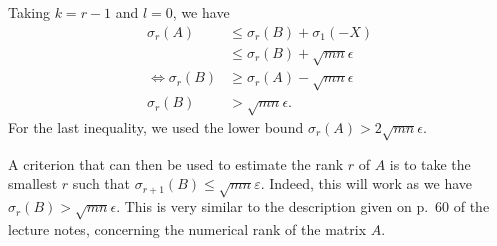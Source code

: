 \documentclass[11pt]{article}
\newcommand{\snorm}[1]{\norm{#1}_2} %
\begin{document}
Taking $k = r-1$ and $l = 0$, we have
\begin{align*}
\sigma_r(A) &\leqslant \sigma_{r}(B) + \sigma_{1}(-X)\\
&\leqslant \sigma_{r}(B) + \sqrt{mn}\epsilon\\
\iff \sigma_r(B) &\geqslant \sigma_r(A) - \sqrt{mn}\epsilon\\
 \sigma_r(B)&> \sqrt{mn}\epsilon.
\end{align*}
For the last inequality, we used the lower bound $\sigma_r(A) > 2\sqrt{mn}\epsilon$.

A criterion that can then be used to estimate the rank \(r\) of \(A\) is to take the smallest \(r\) such that \(\sigma_{r + 1}(B) \leqslant \sqrt{mn} \varepsilon\). Indeed, this will work as we have $\sigma_r(B)> \sqrt{mn}\epsilon$.
This is very similar to the description given on p.~60 of the lecture notes, concerning the numerical rank of the matrix \(A\). 

\end{document}
